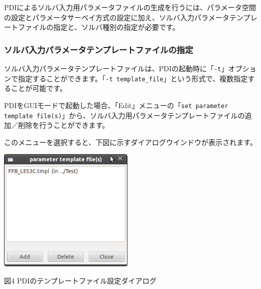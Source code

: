 \documentclass[a4paper,11pt]{jarticle}
\begin{document}
PDIによるソルバ入力用パラメータファイルの生成を行うには、パラメータ空間の設定とパラメータサーベイ方式の設定に加え、ソルバ入力パラメータテンプレートファイルの指定と、ソルバ種別の指定が必要です。

\subsubsection{ソルバ入力パラメータテンプレートファイルの指定}

ソルバ入力パラメータテンプレートファイルは、PDIの起動時に「{\tt -t}」オプションで指定することができます。「{\tt -t template\_file}」という形式で、複数指定することが可能です。

PDIをGUIモードで起動した場合、「Edit」メニューの「{\tt set parameter template file(s)}」から、ソルバ入力用パラメータテンプレートファイルの追加／削除を行うことができます。

このメニューを選択すると、下図に示すダイアログウインドウが表示されます。

\begin{center}
\includegraphics[width=184pt, bb=0 0 327 296]{figs/fig003.png}

図4 PDIのテンプレートファイル設定ダイアログ
\end{center}
\end{document}
